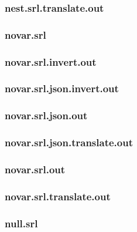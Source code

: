 \subsubsection{nest.srl.translate.out}
\label{app:nest_srl.translate.out}

\subsubsection{novar.srl}
\label{app:novar_srl}

\subsubsection{novar.srl.invert.out}
\label{app:novar_srl.invert.out}

\subsubsection{novar.srl.json.invert.out}
\label{app:novar_srl.json.invert.out}

\subsubsection{novar.srl.json.out}
\label{app:novar_srl.json.out}

\subsubsection{novar.srl.json.translate.out}
\label{app:novar_srl.json.translate.out}

\subsubsection{novar.srl.out}
\label{app:novar_srl.out}

\subsubsection{novar.srl.translate.out}
\label{app:novar_srl.translate.out}

\subsubsection{null.srl}
\label{app:null_srl}

